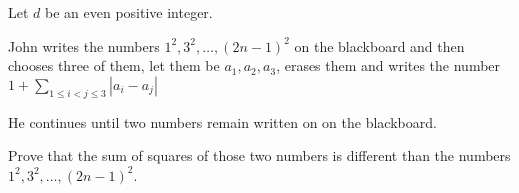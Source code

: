 Let $d$ be an even positive integer.

John writes the numbers $1^2 ,3^2 ,\ldots,(2n-1)^2 $ on the blackboard and then chooses three of them,  let them be ${a_1}, {a_2}, {a_3}$,  erases them and writes the number $1+ \displaystyle\sum_{1\le i<j\leq 3} |{a_i} -{a_j}|$

He continues until two numbers remain written on on the blackboard.

Prove that the sum of squares of those two numbers is different than the numbers  $1^2 ,3^2 ,\ldots,(2n-1)^2$.
